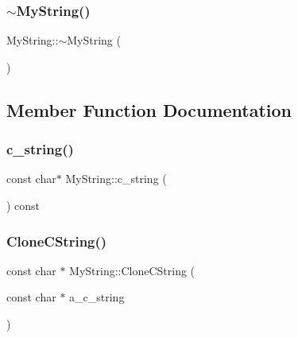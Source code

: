 \subsubsection{\texorpdfstring{$\sim$\+My\+String()}{~MyString()}}
{\footnotesize\ttfamily My\+String\+::$\sim$\+My\+String (\begin{DoxyParamCaption}{ }\end{DoxyParamCaption})\hspace{0.3cm}{\ttfamily [inline]}}



\subsection{Member Function Documentation}
\mbox{\label{class_my_string_aff2af0cf30db39fe24a235670ee6ff25}} 
\subsubsection{\texorpdfstring{c\+\_\+string()}{c\_string()}}
{\footnotesize\ttfamily const char$\ast$ My\+String\+::c\+\_\+string (\begin{DoxyParamCaption}{ }\end{DoxyParamCaption}) const\hspace{0.3cm}{\ttfamily [inline]}}

\mbox{\label{class_my_string_a40753dcfa3314a8993f32bdd75d67ce2}} 
\subsubsection{\texorpdfstring{Clone\+C\+String()}{CloneCString()}}
{\footnotesize\ttfamily const char $\ast$ My\+String\+::\+Clone\+C\+String (\begin{DoxyParamCaption}\item[{const char $\ast$}]{a\+\_\+c\+\_\+string }\end{DoxyParamCaption})\hspace{0.3cm}{\ttfamily [static]}}

\mbox{\label{class_my_string_a4eb168b1ec401a732b3859abe004d648}} 
